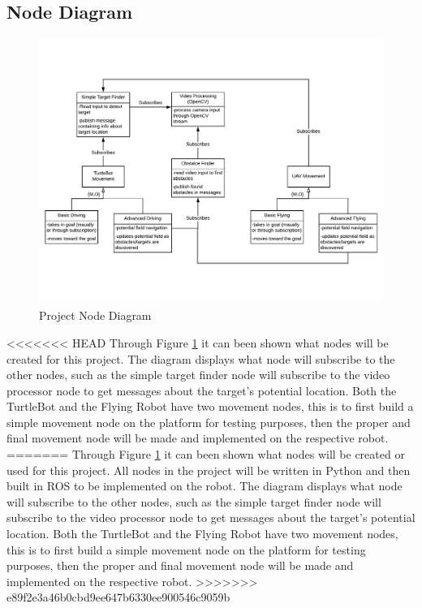 \documentclass{article}
\begin{document}
	\subsection{Node Diagram}

	\begin{figure}[H]
		\centering
		\includegraphics[width=0.9\linewidth]{NodeDiagram}
		\caption{Project Node Diagram}
		\label{fig:nodediagram}
	\end{figure}

<<<<<<< HEAD
	Through Figure \ref{fig:nodediagram} it can been shown what nodes will be created for this project. The diagram displays what node will subscribe to the other nodes, such as the simple target finder node will subscribe to the video processor node to get messages about the target's potential location. Both the TurtleBot and the Flying Robot have two movement nodes, this is to first build a simple movement node on the platform for testing purposes, then the proper and final movement node will be made and implemented on the respective robot. 
=======
	Through Figure \ref{fig:nodediagram} it can been shown what nodes will be created or used for this project. All nodes in the project will be written in Python and then built in ROS to be implemented on the robot. The diagram displays what node will subscribe to the other nodes, such as the simple target finder node will subscribe to the video processor node to get messages about the target's potential location. Both the TurtleBot and the Flying Robot have two movement nodes, this is to first build a simple movement node on the platform for testing purposes, then the proper and final movement node will be made and implemented on the respective robot. 
>>>>>>> e89f2e3a46b0cbd9ee647b6330ee900546c9059b
	
\end{document}

